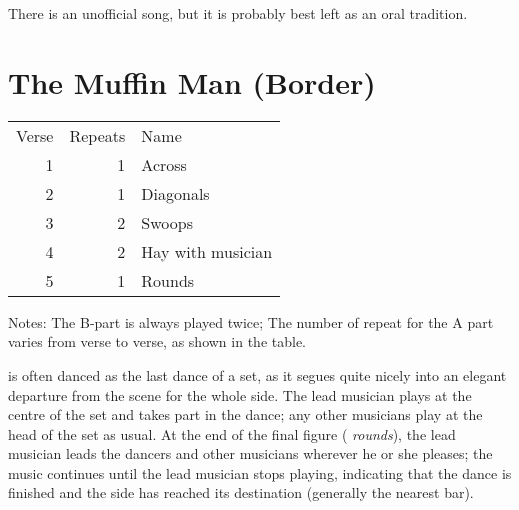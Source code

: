 \documentclass[12pt,a4paper]{article}
\begin{document}
There is an unofficial song, but it is probably best left
as an oral tradition.

\section{The Muffin Man (Border)}


\begin{minipage}[t]{7cm}
\vspace{0pt}
\begin{tabular}{rrl}
Verse & Repeats & Name \\
1 & 1 & Across \\
2 & 1 & Diagonals \\
3 & 2 & Swoops \\
4 & 2 & Hay with musician \\
5 & 1 & Rounds \\
\end{tabular}
\end{minipage} \hspace{3mm} \begin{minipage}[t]{9cm}
\vspace{0pt}
\noindent Notes: The B-part is always played twice; The number of
repeat for the A part varies from verse to verse, as shown in the
table.
\end{minipage}

\medskip

 is often danced as the last dance of a
set, as it segues quite nicely into an elegant departure from the
scene for the whole side.  The lead musician plays at the centre of
the set and takes part in the dance; any other musicians play at the
head of the set as usual. At the end of the final figure ({\it
  rounds}), the lead musician leads the dancers and other musicians
wherever he or she pleases; the music continues until the lead
musician stops playing, indicating that the dance is finished and the
side has reached its destination (generally the nearest bar).

\newenvironment{dance}[3]
{\begin{minipage}[t][60mm]{53mm}
\smallskip\small
{\bf #1}\\
#2 dancers / #3
\vspace{-2mm}
\begin{tabbing}
}
{\end{tabbing}\end{minipage}}
\end{document}
